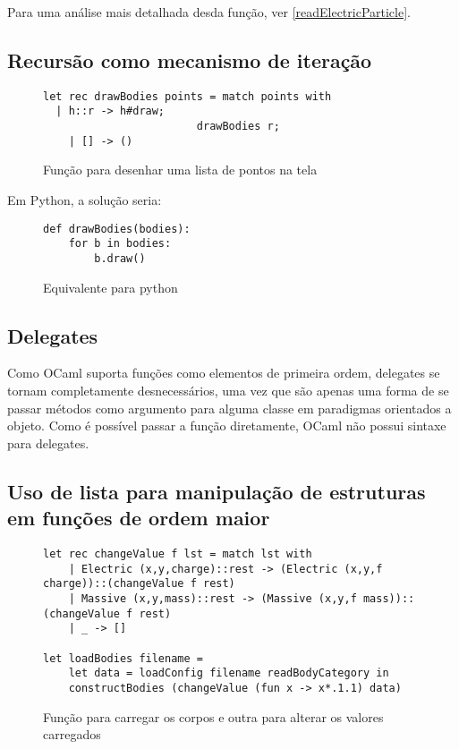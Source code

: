 \documentclass[a4paper,10pt]{article}
\begin{document}
	Para uma análise mais detalhada desda função, ver \autoref{readElectricParticle}.

\subsection{Recursão como mecanismo de iteração}

\begin{figure}[H]
	\centering	
	\begin{lstlisting}
let rec drawBodies points = match points with
  | h::r -> h#draw;
						drawBodies r;
	| [] -> ()
	\end{lstlisting}
	\caption{Função para desenhar uma lista de pontos na tela}
\end{figure}

	Em Python, a solução seria:
	
	\begin{figure}[H]
	\centering	
	\begin{lstlisting}
def drawBodies(bodies):
	for b in bodies:
		b.draw()	
	\end{lstlisting}
	\caption{Equivalente para python}
\end{figure}
	
\subsection{Delegates}
	
	Como OCaml suporta funções como elementos de primeira ordem, delegates se tornam completamente desnecessários, uma vez que são apenas uma forma de se passar métodos como argumento para alguma classe em paradigmas orientados a objeto. Como é possível passar a função diretamente, OCaml não possui sintaxe para delegates.
	
\subsection{Uso de lista para manipulação de estruturas em funções de ordem maior}
	
		\begin{figure}[H]
	\centering	
	\begin{lstlisting}
let rec changeValue f lst = match lst with
	| Electric (x,y,charge)::rest -> (Electric (x,y,f charge))::(changeValue f rest)
	| Massive (x,y,mass)::rest -> (Massive (x,y,f mass))::(changeValue f rest)
	| _ -> []

let loadBodies filename =
	let data = loadConfig filename readBodyCategory in
	constructBodies (changeValue (fun x -> x*.1.1) data)
	\end{lstlisting}
	\caption{Função para carregar os corpos e outra para alterar os valores carregados}
	\end{figure}
\end{document}
